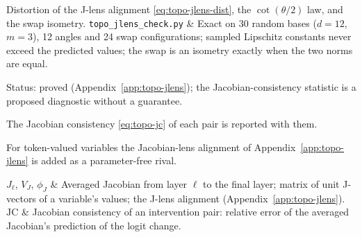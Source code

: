 \addlinespace
Distortion of the J-lens alignment \eqref{eq:topo-jlens-dist}, the
$\cot(\theta/2)$ law, and the swap isometry.
\newline\texttt{topo\_jlens\_check.py}
& Exact on 30 random bases ($d=12$, $m=3$), 12 angles and 24 swap
configurations; sampled Lipschitz constants never exceed the predicted
values; the swap is an isometry exactly when the two norms are equal. \\

\item[T7f, J-lens distortion.] Status: proved
(Appendix~\ref{app:topo-jlens}); the Jacobian-consistency statistic is a
proposed diagnostic without a guarantee.

The Jacobian consistency \eqref{eq:topo-jc} of each pair is reported with
them.

For token-valued variables the Jacobian-lens alignment of
Appendix~\ref{app:topo-jlens} is added as a parameter-free rival.

$J_\ell$, $V_J$, $\phi_J$ & Averaged Jacobian from layer $\ell$ to the final
layer; matrix of unit J-vectors of a variable's values; the J-lens
alignment (Appendix~\ref{app:topo-jlens}). \\ \addlinespace
$\mathrm{JC}$ & Jacobian consistency of an intervention pair: relative
error of the averaged Jacobian's prediction of the logit change. \\
\addlinespace

